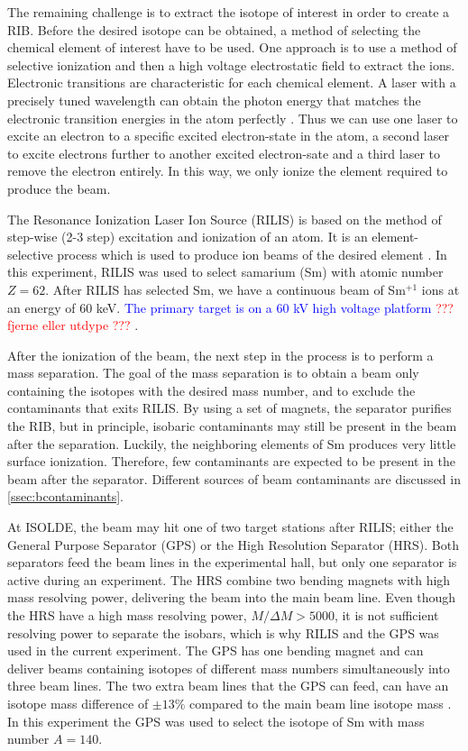 \documentclass[twoside,english]{uiofysmaster/uiofysmaster}
\let\orgautoref\autoref
\renewcommand{\autoref}
        {%
		 \def\sectionautorefname{Section}%
		 \def\subsectionautorefname{Section}%
		 \def\subsubsectionautorefname{Section}%
		 \def\chapterautorefname{Chapter}%
          \orgautoref}
\begin{document}
The remaining challenge is to extract the isotope of interest in order to create a RIB. 
Before the desired isotope can be obtained, a method of selecting the chemical element of interest have to be used.
One approach is to use a method of selective ionization and then a high voltage electrostatic field to extract the ions. 
Electronic transitions are characteristic for each chemical element. 
A laser with a precisely tuned wavelength can obtain the photon energy that matches the electronic transition energies in the atom perfectly \cite{RILIS-web, RILIS2013}. 
Thus we can use one laser to excite an electron to a specific excited electron-state in the atom, a second laser to excite electrons further to another excited electron-sate and a third laser to remove the electron entirely. 
In this way, we only ionize the element required to produce the beam. 

The Resonance Ionization Laser Ion Source (RILIS) is based on the method of step-wise (2-3 step) excitation and ionization of an atom. 
It is an element-selective process which is used to produce ion beams of the desired element \cite{RILIS}. 
In this experiment, RILIS was used to select samarium (Sm) with atomic number $Z = 62$. 
After RILIS has selected Sm, we have a continuous beam of Sm$^{+1}$ ions at an energy of 60 keV. 
\textcolor{blue}{The primary target is on a 60 kV high voltage platform} \textcolor{red}{??? fjerne eller utdype ???} \cite{ISOLDE-web, TIF}. 

After the ionization of the beam, the next step in the process is to perform a mass separation.
The goal of the mass separation is to obtain a beam only containing the isotopes with the desired mass number, and to exclude the contaminants that exits RILIS. 
By using a set of magnets, the separator purifies the RIB, but in principle, isobaric contaminants may still be present in the beam after the separation. 
Luckily, the neighboring elements of Sm produces very little surface ionization. 
Therefore, few contaminants are expected to be present in the beam after the separator. 
Different sources of beam contaminants are discussed in \autoref{ssec:bcontaminants}.

At ISOLDE, the beam may hit one of two target stations after RILIS; either the General Purpose Separator (GPS) or the High Resolution Separator (HRS). 
Both separators feed the beam lines in the experimental hall, but only one separator is active during an experiment. 
The HRS combine two bending magnets with high mass resolving power, delivering the beam into the main beam line. 
Even though the HRS have a high mass resolving power, $M/\Delta M > 5000$, it is not sufficient resolving power to separate the isobars, which is why RILIS and the GPS was used in the current experiment.
The GPS has one bending magnet and can deliver beams containing isotopes of different mass numbers simultaneously into three beam lines. 
The two extra beam lines that the GPS can feed, can have an isotope mass difference of $\pm 13 \%$ compared to the main beam line isotope mass \cite{GPS, TIF}.
In this experiment the GPS was used to select the isotope of Sm with mass number $A = 140$. 
\end{document}
